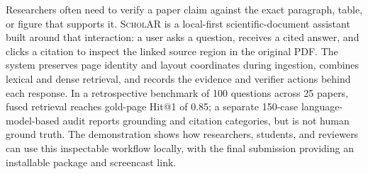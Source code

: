 Researchers often need to verify a paper claim against the exact paragraph, table, or figure that supports it. \textsc{ScholAR} is a local-first scientific-document assistant built around that interaction: a user asks a question, receives a cited answer, and clicks a citation to inspect the linked source region in the original PDF. The system preserves page identity and layout coordinates during ingestion, combines lexical and dense retrieval, and records the evidence and verifier actions behind each response. In a retrospective benchmark of 100 questions across 25 papers, fused retrieval reaches gold-page Hit@1 of 0.85; a separate 150-case language-model-based audit reports grounding and citation categories, but is not human ground truth. The demonstration shows how researchers, students, and reviewers can use this inspectable workflow locally, with the final submission providing an installable package and screencast link.
